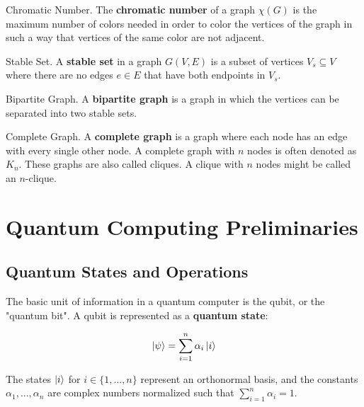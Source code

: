 \begin{definition}{Chromatic Number.}
    \label{defn:colors}
	The \textbf{chromatic number} of a graph $\chi(G)$ is the maximum number of colors needed in order to color the vertices of the graph in such a way that vertices of the same color are not adjacent.
\end{definition}

\begin{definition}{Stable Set.}
    \label{defn:stable-set}
    A \textbf{stable set} in a graph $G(V,E)$ is a subset of vertices $V_s \subseteq  V$ where there are no edges $e \in E$ that have both endpoints in $V_s$.
\end{definition}

\begin{definition}{Bipartite Graph.}
    \label{defn:bipartite}
	A \textbf{bipartite graph} is a graph in which the vertices can be separated into two stable sets.
\end{definition}

\begin{definition}{Complete Graph.}
    \label{defn:clique}
    A \textbf{complete graph} is a graph where each node has an edge with every single other node. A complete graph with $n$ nodes is often denoted as $K_n$. These graphs are also called cliques. A clique with $n$ nodes might be called an $n$-clique.
\end{definition}

\section{Quantum Computing Preliminaries}
\label{sec:qc}

\subsection{Quantum States and Operations}

The basic unit of information in a quantum computer is the qubit, or the "quantum bit". A qubit is represented as a \textbf{quantum state}:

\begin{align*}
    \ket{\psi} &= \sum_{i=1}^n \alpha_i\ket{i} \\ 
\end{align*}

The states $\ket{i}$ for $i \in \{1,...,n\}$ represent an orthonormal basis, and the constants $\alpha_1,...,\alpha_n$ are complex numbers normalized such that $\sum_{i=1}^n \alpha_i = 1$.

